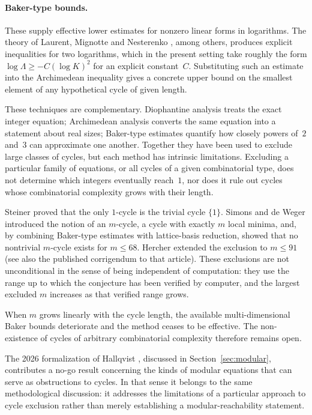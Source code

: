 \documentclass[11pt,reqno,oneside]{amsart}
\begin{document}
\paragraph{Baker-type bounds.}
These supply effective lower estimates for nonzero linear forms in logarithms. The theory of Laurent, Mignotte and Nesterenko \cite{LaurentMignotteNesterenko95}, among others, produces explicit inequalities for two logarithms, which in the present setting take roughly the form $\log\Lambda\ge -C(\log K)^2$ for an explicit constant~$C$. Substituting such an estimate into the Archimedean inequality gives a concrete upper bound on the smallest element of any hypothetical cycle of given length.

These techniques are complementary. Diophantine analysis treats the exact integer equation; Archimedean analysis converts the same equation into a statement about real sizes; Baker-type estimates quantify how closely powers of~$2$ and~$3$ can approximate one another. Together they have been used to exclude large classes of cycles, but each method has intrinsic limitations. Excluding a particular family of equations, or all cycles of a given combinatorial type, does not determine which integers eventually reach~$1$, nor does it rule out cycles whose combinatorial complexity grows with their length.

Steiner \cite{Steiner77} proved that the only $1$-cycle is the trivial cycle $\{1\}$. Simons and de Weger \cite{SimonsdeWeger05} introduced the notion of an $m$-cycle, a cycle with exactly $m$ local minima, and, by combining Baker-type estimates with lattice-basis reduction, showed that no nontrivial $m$-cycle exists for $m\le 68$. Hercher \cite{Hercher23} extended the exclusion to $m\le 91$ (see also the published corrigendum to that article). These exclusions are not unconditional in the sense of being independent of computation: they use the range up to which the conjecture has been verified by computer, and the largest excluded $m$ increases as that verified range grows.

When $m$ grows linearly with the cycle length, the available multi-dimensional Baker bounds deteriorate and the method ceases to be effective. The non-existence of cycles of arbitrary combinatorial complexity therefore remains open.

The 2026 formalization of Hallqvist \cite{Hallqvist26}, discussed in Section~\ref{sec:modular}, contributes a no-go result concerning the kinds of modular equations that can serve as obstructions to cycles. In that sense it belongs to the same methodological discussion: it addresses the limitations of a particular approach to cycle exclusion rather than merely establishing a modular-reachability statement.
\end{document}
